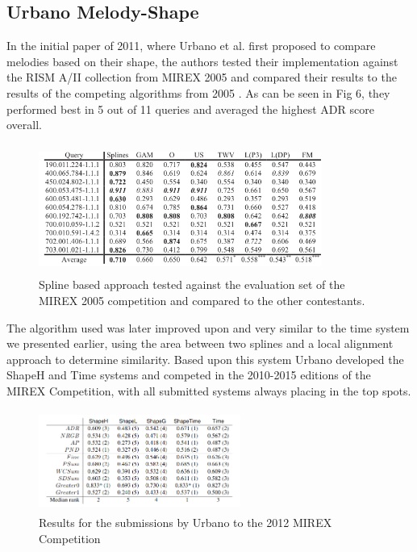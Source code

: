 \documentclass{llncs}
\begin{document}
\begin{itemize}
    \subsection{Urbano Melody-Shape}
            In the initial paper of 2011, where Urbano et al. first proposed to compare melodies based on their shape, the authors tested their implementation against the RISM A/II collection from MIREX 2005 and compared their results to the results of the competing algorithms from 2005 \cite{five_point_five}. As can be seen in Fig 6, they performed best in 5 out of 11 queries and averaged the highest ADR score overall. 
        \begin{figure}[h!]
			\centering
            \includegraphics[width=350px,height=160px,keepaspectratio]{one_of_five_point_five}
			\caption{Spline based approach tested against the evaluation set of the MIREX 2005 competition and compared to the other contestants. \cite{five_point_five}}
        \end{figure}
            The algorithm used was later improved upon and very similar to the time system we presented earlier, using the area between two splines and a local alignment approach to determine similarity. Based upon this system Urbano developed the ShapeH and Time systems  and competed in the 2010-2015 editions of the MIREX Competition, with all submitted systems always placing in the top spots. 
        \begin{figure}[h!]
			\centering
            \includegraphics[width=250px,height=125px,keepaspectratio]{urbano_mirex_2012_results}
			\caption{Results for the submissions by Urbano to the 2012 MIREX Competition \cite{five_point_four}}
        \end{figure}
        \begin{figure}[h!]

\end{figure}
\end{itemize}
\end{document}
